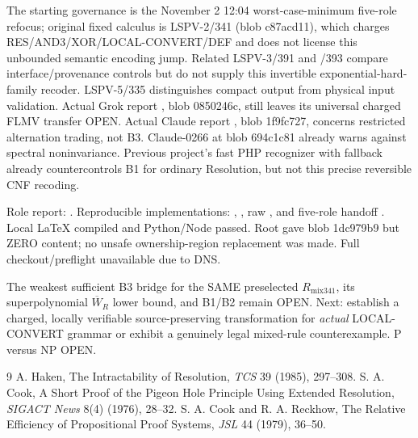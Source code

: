 \documentclass[11pt]{article}
\begin{document}
The starting governance is the November 2 12:04 worst-case-minimum five-role refocus; original fixed calculus is LSPV-2/341 (blob c87acd11), which charges RES/AND3/XOR/LOCAL-CONVERT/DEF and does not license this unbounded semantic encoding jump. Related LSPV-3/391 and /393 compare interface/provenance controls but do not supply this invertible exponential-hard-family recoder. LSPV-5/335 distinguishes compact output from physical input validation. Actual Grok report , blob 0850246c, still leaves its universal charged FLMV transfer OPEN. Actual Claude report , blob 1f9fc727, concerns restricted alternation trading, not B3. Claude-0266 at blob 694c1c81 already warns against spectral noninvariance. Previous project's fast PHP recognizer with fallback already countercontrols B1 for ordinary Resolution, but not this precise reversible CNF recoding.

Role report: . Reproducible implementations: , , raw , and five-role handoff . Local LaTeX compiled and Python/Node passed. Root  gave blob 1dc979b9 but ZERO content; no unsafe ownership-region replacement was made. Full checkout/preflight unavailable due to DNS.

The weakest sufficient B3 bridge for the SAME preselected \(R_{\mathrm{mix341}}\), its superpolynomial \(\overline W_R\) lower bound, and B1/B2 remain OPEN. Next: establish a charged, locally verifiable source-preserving transformation for \emph{actual} LOCAL-CONVERT grammar or exhibit a genuinely legal mixed-rule counterexample. P versus NP OPEN.
\begin{thebibliography}{9}
 A. Haken, The Intractability of Resolution, \emph{TCS} 39 (1985), 297--308.
 S. A. Cook, A Short Proof of the Pigeon Hole Principle Using Extended Resolution, \emph{SIGACT News} 8(4) (1976), 28--32.
 S. A. Cook and R. A. Reckhow, The Relative Efficiency of Propositional Proof Systems, \emph{JSL} 44 (1979), 36--50.
\end{thebibliography}
\end{document}
